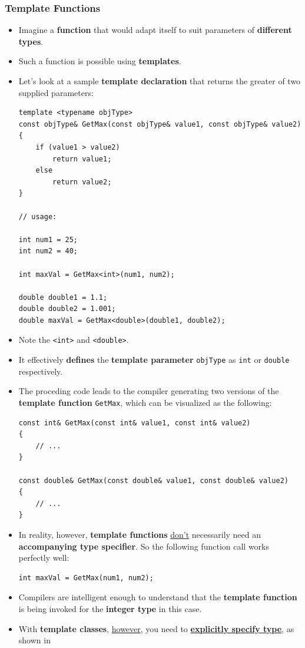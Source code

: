 \documentclass[10pt]{article}
\begin{document}
\subsubsection{Template Functions}
\begin{itemize}
\item Imagine a \textbf{function} that would adapt itself to suit parameters of \textbf{different types}.
\item Such a function is possible using \textbf{templates}.

\item Let's look at a sample \textbf{template declaration} that returns the greater of two supplied parameters:

	\begin{verbatim}
template <typename objType>
const objType& GetMax(const objType& value1, const objType& value2)
{
	if (value1 > value2)
		return value1;
	else
		return value2;
}

// usage:

int num1 = 25;
int num2 = 40;

int maxVal = GetMax<int>(num1, num2);

double double1 = 1.1;
double double2 = 1.001;
double maxVal = GetMax<double>(double1, double2);
	\end{verbatim}

\item Note the \verb|<int>| and \verb|<double>|.
\item It effectively \textbf{defines} the \textbf{template parameter} \verb|objType| as \verb|int| or \verb|double| respectively.

\item The proceding code leads to the compiler generating two versions of the \textbf{template function} \verb|GetMax|, which can be visualized as the following:

\begin{verbatim}
const int& GetMax(const int& value1, const int& value2)
{
	// ...
}

const double& GetMax(const double& value1, const double& value2)
{
	// ...
}
\end{verbatim}

\item In reality, however, \textbf{template functions} \underline{don't} necessarily need an \textbf{accompanying type specifier}. So the following function call works perfectly well:

	\begin{verbatim}
int maxVal = GetMax(num1, num2);
	\end{verbatim}

\item Compilers are intelligent enough to understand that the \textbf{template function} is being invoked for the \textbf{integer type} in this case.

\item With \textbf{template classes}, \underline{however}, you need to \underline{\textbf{explicitly specify type}}, as shown in 
\end{itemize}
\end{document}
